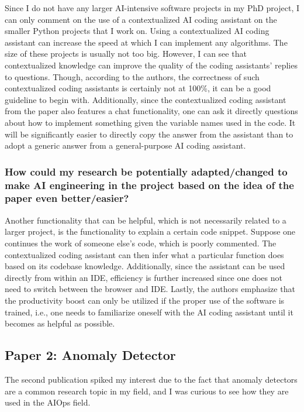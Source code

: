 \documentclass[11pt]{article}
\begin{document}
Since I do not have any larger AI-intensive software projects in my PhD project, I can only comment on the use of a contextualized AI coding assistant on the smaller Python projects that I work on. 
Using a contextualized AI coding assistant can increase the speed at which I can implement any algorithms. 
The size of these projects is usually not too big. However, I can see that contextualized knowledge can improve the quality of the coding assistants' replies to questions. 
Though, according to the authors, the correctness of such contextualized coding assistants is certainly not at 100\%, it can be a good guideline to begin with. Additionally, since the contextualized coding assistant from the paper also features a chat functionality, one can ask it directly questions about how to implement something given the variable names used in the code. It will be significantly easier to directly copy the answer from the assistant than to adopt a generic answer from a general-purpose AI coding assistant.

\subsubsection{How could my research be potentially adapted/changed to make AI engineering in the project based on the idea of the paper even better/easier?}

Another functionality that can be helpful, which is not necessarily related to a larger project, is the functionality to explain a certain code snippet. Suppose one continues the work of someone else's code, which is poorly commented. The contextualized coding assistant can then infer what a particular function does based on its codebase knowledge. 
Additionally, since the assistant can be used directly from within an IDE, efficiency is further increased since one does not need to switch between the browser and IDE. 
Lastly, the authors emphasize that the productivity boost can only be utilized if the proper use of the software is trained, i.e., one needs to familiarize oneself with the AI coding assistant until it becomes as helpful as possible.

\subsection{Paper 2: Anomaly Detector}

The second publication spiked my interest due to the fact that anomaly detectors are a common research topic in my field, and I was curious to see how they are used in the AIOps field.
\end{document}
